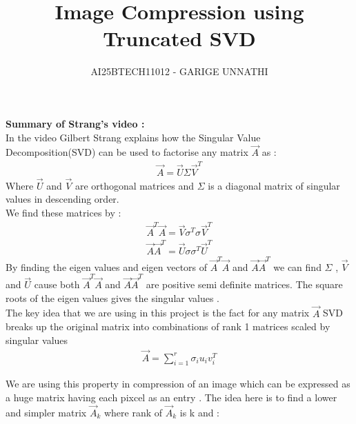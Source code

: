 \documentclass[journal]{IEEEtran}
\begin{document}



\title{Image Compression using Truncated SVD}
\author{AI25BTECH11012 - GARIGE UNNATHI}
{\let\newpage\relax\maketitle}


\renewcommand{\thefigure}{\theenumi}
\renewcommand{\thetable}{\theenumi}
\setlength{\intextsep}{10pt} %



\vspace{-1cm}
\textbf{Summary of Strang's video :}\\

In the video Gilbert Strang explains how the Singular Value Decomposition(SVD) can be used to factorise any matrix $\vec{A}$ as :
\begin{align*}
    \vec{A} = \vec{U}\Sigma\vec{V}^T
\end{align*}
Where $\vec{U}$ and $\vec{V}$ are orthogonal matrices and $\Sigma$ is a diagonal matrix of singular values in descending order.\\
We find these matrices by :
\begin{align*}
   \vec{A}^T\vec{A} = \vec{V}\sigma^T\sigma\vec{V}^T\\
   \vec{A}\vec{A}^T = \vec{U}\sigma\sigma^T\vec{U}^T
\end{align*}
By finding the eigen values and eigen vectors of $\vec{A}^T\vec{A}$ and $\vec{A}\vec{A}^T$  we can find $\Sigma$ , $\vec{V}$ and $\vec{U}$ cause both $\vec{A}^T\vec{A}$ and $\vec{A}\vec{A}^T$ are positive semi definite matrices. The square roots of the eigen values gives the singular values .\\


The key idea that we are using in this project is the fact for any  matrix $\vec{A}$ SVD breaks up the original matrix into combinations of rank 1 matrices scaled by singular values
\begin{align*}
    \vec{A} = \sum_{i=1}^{r} \sigma_i u_i v_i^T
\end{align*}

We are using this property in compression of an image which can be expressed as a huge matrix having each pixcel as an entry . The idea here is to find a lower and simpler matrix $\vec{A}_k$ where rank of $\vec{A}_k$ is k and :
\end{document}
